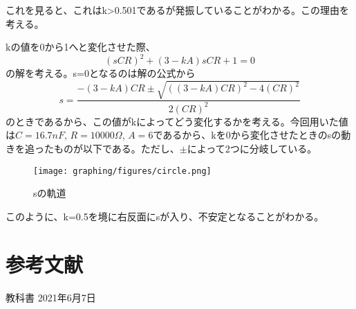 \documentclass{ltjsarticle}
\begin{document}
これを見ると、これはk>0.501であるが発振していることがわかる。この理由を考える。

kの値を0から1へと変化させた際、
$$
(sCR)^2 + (3-kA)sCR + 1 = 0
$$
の解を考える。s=0となるのは解の公式から
$$
s = \frac{-(3-kA)CR \pm \sqrt{((3-kA)CR)^2 - 4(CR)^2}}{2(CR)^2}
$$
のときであるから、この値がkによってどう変化するかを考える。今回用いた値は$C = 16.7nF$, $R = 10000\Omega$, $A=6$であるから、kを0から変化させたときのsの動きを追ったものが以下である。ただし、$\pm$によって2つに分岐している。
\begin{figure}[H]
    \begin{center}
        \texttt{[image: graphing/figures/circle.png]}
        \caption{sの軌道}
    \end{center}
\end{figure}
このように、k=0.5を境に右反面にsが入り、不安定となることがわかる。

\section{参考文献}
教科書 2021年6月7日
\end{document}
